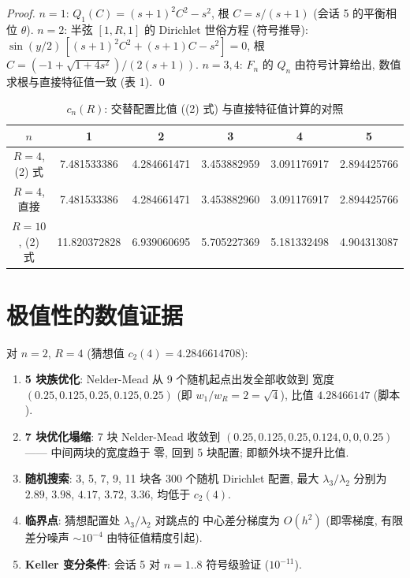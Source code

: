 \documentclass[UTF8]{ctexart}
\begin{document}
\begin{proof}
	$n = 1$: $Q_1(C) = (s+1)^2C^2 - s^2$, 根 $C = s/(s+1)$
	(会话 5 的平衡相位 $\theta$). $n = 2$: 半弦 $[1,R,1]$ 的 Dirichlet
	世俗方程 (符号推导): $\sin(y/2)\,[(s+1)^2C^2 + (s+1)C - s^2] = 0$,
	根 $C = (-1 + \sqrt{1+4s^2})/(2(s+1))$. $n = 3, 4$: $F_n$ 的
	$Q_n$ 由符号计算给出, 数值求根与直接特征值一致 (表 1). \qed
\end{proof}

\begin{table}[ht]
\centering
\caption{$c_n(R)$: 交替配置比值 ((2) 式) 与直接特征值计算的对照}
\begin{tabular}{c|ccccc}
	$n$ & 1 & 2 & 3 & 4 & 5 \\\hline
	$R=4$, (2) 式 & 7.481533386 & 4.284661471 & 3.453882959 & 3.091176917 & 2.894425766\\
	$R=4$, 直接 & 7.481533386 & 4.284661471 & 3.453882960 & 3.091176917 & 2.894425766\\
	$R=10$, (2) 式 & 11.820372828 & 6.939060695 & 5.705227369 & 5.181332498 & 4.904313087
\end{tabular}
\end{table}

\section{极值性的数值证据}

对 $n=2$, $R=4$ (猜想值 $c_2(4) = 4.2846614708$):
\begin{enumerate}
	\item \textbf{5 块族优化}: Nelder-Mead 从 9 个随机起点出发全部收敛到
		宽度 $(0.25, 0.125, 0.25, 0.125, 0.25)$ (即 $w_1/w_R = 2 =
		\sqrt 4$), 比值 $4.28466147$ (脚本 ).
	\item \textbf{7 块优化塌缩}: 7 块 Nelder-Mead 收敛到
		$(0.25, 0.125, 0.25, 0.124, 0, 0, 0.25)$ —— 中间两块的宽度趋于
		零, 回到 5 块配置; 即额外块不提升比值.
	\item \textbf{随机搜索}: 3, 5, 7, 9, 11 块各 300 个随机 Dirichlet
		配置, 最大 $\lambda_3/\lambda_2$ 分别为 $2.89$, $3.98$, $4.17$,
		$3.72$, $3.36$, 均低于 $c_2(4)$.
	\item \textbf{临界点}: 猜想配置处 $\lambda_3/\lambda_2$ 对跳点的
		中心差分梯度为 $O(h^2)$ (即零梯度, 有限差分噪声 $\sim
		10^{-4}$ 由特征值精度引起).
	\item \textbf{Keller 变分条件}: 会话 5 对 $n = 1..8$ 符号级验证
		($10^{-11}$).
\end{enumerate}
\end{document}
